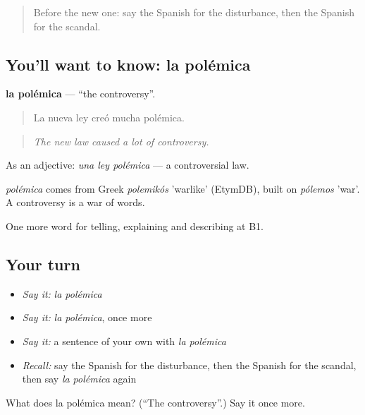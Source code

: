 \label{lesson:ES-C570-polemica}



\begin{quote}
Before the new one: say the Spanish for the disturbance, then the Spanish for the scandal.
\end{quote}

\subsection*{You'll want to know: la polémica}
\textbf{la polémica} — \textquotedblleft{}the controversy\textquotedblright{}.

\begin{quote}
La nueva ley creó mucha polémica.
\end{quote}

\begin{quote}
\emph{The new law caused a lot of controversy.}
\end{quote}

As an adjective: \emph{una ley polémica} — a controversial law.

\begin{cousinweb}
\emph{polémica} comes from Greek \emph{polemikós} 'warlike' (EtymDB), built on \emph{pólemos} 'war'. A controversy is a war of words.
\end{cousinweb}

\begin{grammarlens}[title={What you've built}]
One more word for telling, explaining and describing at B1.
\end{grammarlens}

\subsection*{Your turn}
\begin{itemize}
\raggedright
  \item \emph{Say it:} \emph{la polémica}
  \item \emph{Say it:} \emph{la polémica}, once more
  \item \emph{Say it:} a sentence of your own with \emph{la polémica}
  \item \emph{Recall:} say the Spanish for the disturbance, then the Spanish for the scandal, then say \emph{la polémica} again
\end{itemize}

\begin{tcolorbox}[breakable,colback=teal!4,colframe=teal!35!black,title={Before you move on}]
What does la polémica mean? (\textquotedblleft{}The controversy\textquotedblright{}.) Say it once more.
\end{tcolorbox}
